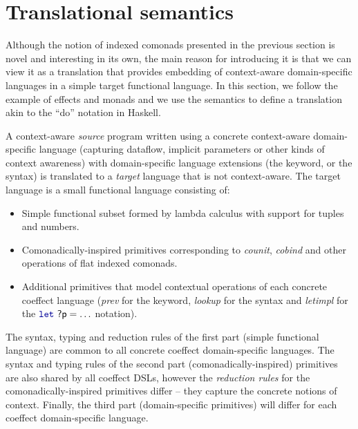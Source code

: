 
\section{Translational semantics}
\label{sec:semantics-translation}

Although the notion of indexed comonads presented in the previous section is novel and interesting
in its own, the main reason for introducing it is that we can view it as a translation that provides
embedding of context-aware domain-specific languages in a simple target functional language.
In this section, we follow the example of effects and monads and we use the semantics to define a
translation akin to the ``do'' notation in Haskell.

A context-aware \emph{source} program written using a concrete context-aware domain-specific
language (capturing dataflow, implicit parameters or other kinds of context awareness) with
domain-specific language extensions (the  keyword, or the  syntax)
is translated to a \emph{target} language that is not context-aware. The target language is
a small functional language consisting of:
%
\begin{itemize}
  \item Simple functional subset formed by lambda calculus with support for tuples and numbers.
  \item Comonadically-inspired primitives corresponding to \emph{counit}, \emph{cobind} and
    other operations of flat indexed comonads.
  \item Additional primitives that model contextual operations of each concrete coeffect language
    (\emph{prev} for the  keyword, \emph{lookup} for the  syntax and
    \emph{letimpl} for the $\kvd{let}~\ident{?p}=\ldots$ notation).
\end{itemize}
%
The syntax, typing and reduction rules of the first part (simple functional language) are common to
all concrete coeffect domain-specific languages. The syntax and typing rules of the second part
(comonadically-inspired) primitives are also shared by all coeffect DSLs, however the \emph{reduction
rules} for the comonadically-inspired primitives differ -- they capture the concrete notions of
context. Finally, the third part (domain-specific primitives) will differ for each coeffect
domain-specific language.


